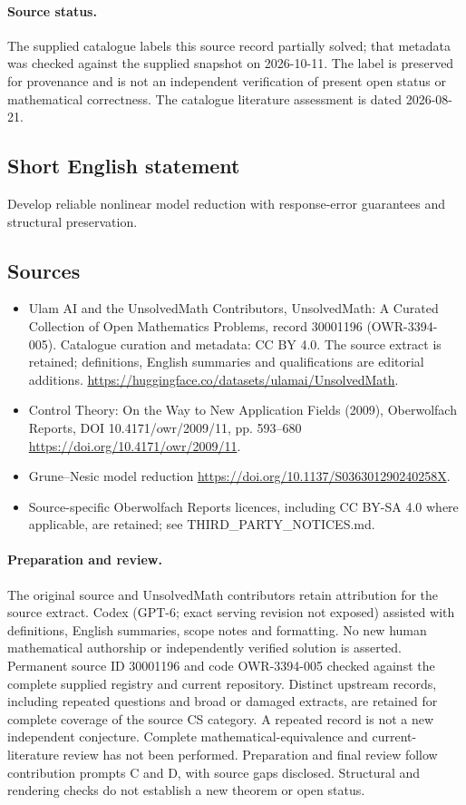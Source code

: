 \documentclass[11pt]{article}
\begin{document}
\paragraph{Source status.}
The supplied catalogue labels this source record partially solved; that metadata was checked against the supplied snapshot on 2026-10-11. The label is preserved for provenance and is not an independent verification of present open status or mathematical correctness. The catalogue literature assessment is dated 2026-08-21.
\subsection{Short English statement}
Develop reliable nonlinear model reduction with response-error guarantees and structural preservation.
\subsection{Sources}
\begin{itemize}
\item[\hypertarget{source:30001196:1}{S1}] Ulam AI and the UnsolvedMath Contributors, UnsolvedMath: A Curated Collection of Open Mathematics Problems, record 30001196 (OWR-3394-005). Catalogue curation and metadata: CC BY 4.0. The source extract is retained; definitions, English summaries and qualifications are editorial additions.
\url{https://huggingface.co/datasets/ulamai/UnsolvedMath}.
\item[\hypertarget{source:30001196:2}{S2}] Control Theory: On the Way to New Application Fields (2009), Oberwolfach Reports, DOI 10.4171/owr/2009/11, pp. 593--680
\url{https://doi.org/10.4171/owr/2009/11}.
\item[\hypertarget{source:30001196:3}{S3}] Grune--Nesic model reduction
\url{https://doi.org/10.1137/S036301290240258X}.
\item Source-specific Oberwolfach Reports licences, including CC BY-SA 4.0 where applicable, are retained; see THIRD\_PARTY\_NOTICES.md.
\end{itemize}
\paragraph{Preparation and review.}
The original source and UnsolvedMath contributors retain attribution for the source extract. Codex (GPT-6; exact serving revision not exposed) assisted with definitions, English summaries, scope notes and formatting. No new human mathematical authorship or independently verified solution is asserted. Permanent source ID 30001196 and code OWR-3394-005 checked against the complete supplied registry and current repository. Distinct upstream records, including repeated questions and broad or damaged extracts, are retained for complete coverage of the source CS category. A repeated record is not a new independent conjecture. Complete mathematical-equivalence and current-literature review has not been performed. Preparation and final review follow contribution prompts C and D, with source gaps disclosed. Structural and rendering checks do not establish a new theorem or open status.
\label{end:30001196}
\end{document}
